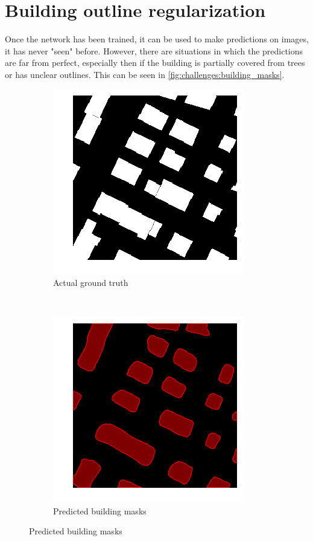 \section{Building outline regularization}
Once the network has been trained, it can be used to make predictions on images, it has never "seen" before. However, there are situations in which the predictions are far from perfect, especially then if the building is partially covered from trees or has unclear outlines. This can be seen in \autoref{fig:challenges:building_masks}.

\begin{figure}[H]
	\centering
	\begin{subfigure}{0.4\textwidth}
		\centering
    	\includegraphics[width=0.9\linewidth]{chapters/challenges/images/predicted_masks_gt.png}		    \caption{Actual ground truth}
    	\label{fig:challenges:predicted_building_masks_gt}
	\end{subfigure}~
		\begin{subfigure}{0.4\textwidth}
		\centering
    	\includegraphics[width=0.9\linewidth]{chapters/challenges/images/predicted_masks.png}		    \caption{Predicted building masks}

\end{subfigure}
\end{figure}
